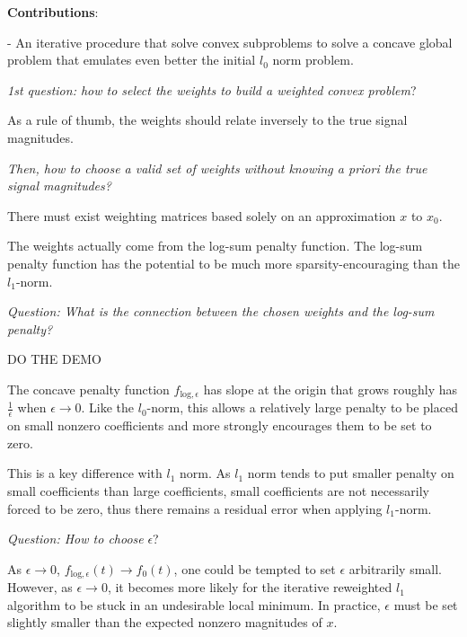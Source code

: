 \documentclass[a4paper,10pt]{article}
\theoremstyle{definition}
\begin{document}
\textbf{Contributions}:
\begin{list}{}{}
    \item - An iterative procedure that solve convex subproblems to solve a concave global problem that emulates even better the initial $l_0$ norm problem. 
\end{list}

\vskip 0.1in

\textit{1st question: how to select the weights to build a weighted convex problem}?

As a rule of thumb, the weights should relate inversely to the true signal magnitudes.

\textit{Then, how to choose a valid set of weights without knowing a priori the true signal magnitudes?}

There must exist weighting matrices based solely on an approximation $x$ to $x_0$. 

\vskip 0.1in

The weights actually come from the log-sum penalty function. The log-sum penalty function has the potential to be much more sparsity-encouraging than the $l_1$-norm.

\vskip 0.1in

\textit{Question: What is the connection between the chosen weights and the log-sum penalty?}

DO THE DEMO

\vskip 0.1in

The concave penalty function $f_{\text{log}, \epsilon}$ has slope at the origin that grows roughly has $\frac{1}{\epsilon}$ when $\epsilon \rightarrow 0$.
Like the $l_0$-norm, this allows a relatively large penalty to be placed on small nonzero coefficients and more strongly encourages them to be set to zero.

This is a key difference with $l_1$ norm. As $l_1$ norm tends to put smaller penalty on small coefficients than large coefficients, small coefficients are not
necessarily forced to be zero, thus there remains a residual error when applying $l_1$-norm.

\vskip 0.1in

\textit{Question: How to choose} $\epsilon$?

As $\epsilon \rightarrow 0$, $f_{\text{log}, \epsilon}(t) \rightarrow f_0(t)$, one could be tempted to set $\epsilon$ arbitrarily small. However, as $\epsilon \rightarrow 0$,
it becomes more likely for the iterative reweighted $l_1$ algorithm to be stuck in an undesirable local minimum.
In practice, $\epsilon$ must be set slightly smaller than the expected nonzero magnitudes of $x$.
\end{document}
